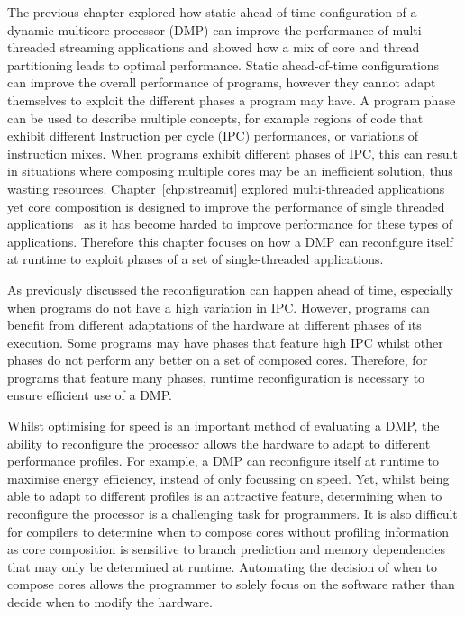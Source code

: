 The previous chapter explored how static ahead-of-time configuration of a dynamic multicore processor (DMP) can improve the performance of multi-threaded streaming applications and showed how a mix of core and thread partitioning leads to optimal performance.
Static ahead-of-time configurations can improve the overall performance of programs, however they cannot adapt themselves to exploit the different phases a program may have.
A program phase can be used to describe multiple concepts, for example regions of code that exhibit different Instruction per cycle (IPC) performances, or variations of instruction mixes.
When programs exhibit different phases of IPC, this can result in situations where composing multiple cores may be an inefficient solution, thus wasting resources.
Chapter~\ref{chp:streamit} explored multi-threaded applications yet core composition is designed to improve the performance of single threaded applications~\cite{ipek2007CoreFusion} as it has become harded to improve performance for these types of applications.
Therefore this chapter focuses on how a DMP can reconfigure itself at runtime to exploit phases of a set of single-threaded applications.

As previously discussed the reconfiguration can happen ahead of time, especially when programs do not have a high variation in IPC.
However, programs can benefit from different adaptations of the hardware at different phases of its execution.
Some programs may have phases that feature high IPC whilst other phases do not perform any better on a set of composed cores.
Therefore, for programs that feature many phases, runtime reconfiguration is necessary to ensure efficient use of a DMP.

Whilst optimising for speed is an important method of evaluating a DMP, the ability to reconfigure the processor allows the hardware to adapt to different performance profiles.
For example, a DMP can reconfigure itself at runtime to maximise energy efficiency, instead of only focussing on speed.
Yet, whilst being able to adapt to different profiles is an attractive feature, determining when to reconfigure the processor is a challenging task for programmers.
It is also difficult for compilers to determine when to compose cores without profiling information as core composition is sensitive to branch prediction and memory dependencies that may only be determined at runtime.%
Automating the decision of when to compose cores allows the programmer to solely focus on the software rather than decide when to modify the hardware.

